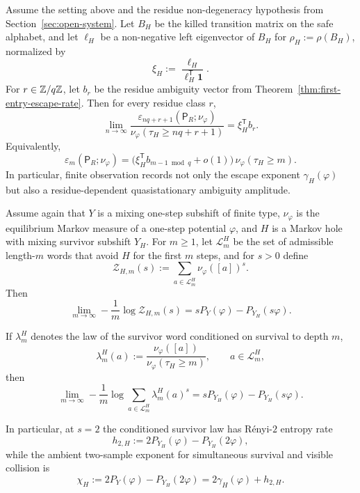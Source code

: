 \begin{theorem}
\label{thm:main-amplitude}
Assume the setting above and the residue non-degeneracy hypothesis from
Section~\ref{sec:open-system}.  Let \(B_H\) be the killed transition
matrix on the safe alphabet, and let \(\ell_H\) be a non-negative left
eigenvector of \(B_H\) for \(\rho_H:=\rho(B_H)\), normalized by
\[
  \xi_H:=\frac{\ell_H}{\ell_H^{\mathsf T}\mathbf 1}.
\]
For \(r\in \mathbb{Z}/q\mathbb{Z}\), let \(b_r\) be the residue ambiguity vector from
Theorem~\ref{thm:first-entry-escape-rate}.  Then for every residue class
\(r\),
\[
  \lim_{n\to\infty}
  \frac{\varepsilon_{nq+r+1}(\mathsf P_R;\nu_\varphi)}
       {\nu_\varphi(\tau_H\ge nq+r+1)}
  = \xi_H^{\mathsf T}b_r.
\]
Equivalently,
\[
  \varepsilon_m(\mathsf P_R;\nu_\varphi)
  = \bigl(\xi_H^{\mathsf T}b_{m-1\bmod q}+o(1)\bigr)\,
    \nu_\varphi(\tau_H\ge m).
\]
In particular, finite observation records not only the escape exponent
\(\gamma_H(\varphi)\) but also a residue-dependent quasistationary
ambiguity amplitude.
\end{theorem}

\begin{theorem}
\label{thm:main-renyi}
Assume again that \(Y\) is a mixing one-step subshift of finite type,
\(\nu_\varphi\) is the equilibrium Markov measure of a one-step
potential \(\varphi\), and \(H\) is a Markov hole with mixing survivor
subshift \(Y_H\).  For \(m\geq 1\), let \(\mathcal L_m^H\) be the set of
admissible length-\(m\) words that avoid \(H\) for the first \(m\)
steps, and for \(s>0\) define
\[
  \mathcal Z_{H,m}(s)
  := \sum_{a\in \mathcal L_m^H} \nu_\varphi([a])^s.
\]
Then
\[
  \lim_{m\to\infty}
  -\frac1m\log \mathcal Z_{H,m}(s)
  = sP_Y(\varphi)-P_{Y_H}(s\varphi).
\]

If \(\lambda_m^H\) denotes the law of the survivor word conditioned on
survival to depth \(m\),
\[
  \lambda_m^H(a)
  := \frac{\nu_\varphi([a])}{\nu_\varphi(\tau_H\ge m)},
  \qquad a\in\mathcal L_m^H,
\]
then
\[
  \lim_{m\to\infty}
  -\frac1m\log
  \sum_{a\in\mathcal L_m^H} \lambda_m^H(a)^s
  = sP_{Y_H}(\varphi)-P_{Y_H}(s\varphi).
\]

In particular, at \(s=2\) the conditioned survivor law has R\'enyi-\(2\)
entropy rate
\[
  h_{2,H}:=2P_{Y_H}(\varphi)-P_{Y_H}(2\varphi),
\]
while the ambient two-sample exponent for simultaneous survival and
visible collision is
\[
  \chi_H:=2P_Y(\varphi)-P_{Y_H}(2\varphi)
        = 2\gamma_H(\varphi)+h_{2,H}.
\]
\end{theorem}

